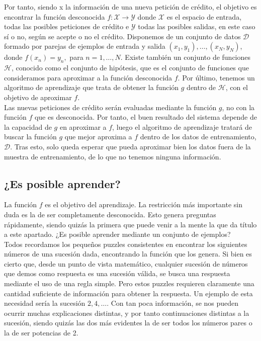 Por tanto, siendo x la información de una nueva petición de crédito, el objetivo es encontrar la función desconocida $f: \mathcal{X} \rightarrow \mathcal{Y}$ donde $\mathcal{X}$ es el espacio de entrada, todas las posibles peticiones de crédito e $\mathcal{Y}$ todas las posibles salidas, en este caso sí o no, según se acepte o no el crédito. Disponemos de un conjunto de datos $\mathcal{D}$ formado por parejas de ejemplos de entrada y salida $(x_1,y_1),\ldots,(x_N,y_N)$, donde $f(x_n)=y_n, $ para $ n = 1,\ldots,N$. Existe también un conjunto de funciones $\mathcal{H}$, conocido como el conjunto de hipótesis, que es el conjunto de funciones que consideramos para aproximar a la función desconocida $f$. Por último, tenemos un algoritmo de aprendizaje que trata de obtener la función $g$ dentro de $\mathcal{H}$, con el objetivo de aproximar $f$.\\

Las nuevas peticiones de crédito serán evaluadas mediante la función $g$, no con la función $f$ que es desconocida. Por tanto, el buen resultado del sistema depende de la capacidad de $g$ en aproximar a $f$, luego el algoritmo de aprendizaje tratará de buscar la función $g$ que mejor aproxima a $f$ dentro de los datos de entrenamiento, $\mathcal{D}$. Tras esto, solo queda esperar que pueda aproximar bien los datos fuera de la muestra de entrenamiento, de lo que no tenemos ninguna información.\\

\subsection{¿Es posible aprender?}

La función $f$ es el objetivo del aprendizaje. La restricción más importante sin duda es la de ser completamente desconocida. Esto genera preguntas rápidamente, siendo quizás la primera que puede venir a la mente la que da título a este apartado. ¿Es posible aprender mediante un conjunto de ejemplos?\\

Todos recordamos los pequeños puzzles consistentes en encontrar los siguientes números de una sucesión dada, encontrando la función que los genera. Si bien es cierto que, desde un punto de vista matemático, cualquier sucesión de números que demos como respuesta es una sucesión válida, se busca una respuesta mediante el uso de una regla simple. Pero estos puzzles requieren claramente una cantidad suficiente de información para obtener la respuesta. Un ejemplo de esta necesidad sería la sucesión ${2,4,\ldots}$. Con tan poca información, se nos pueden ocurrir muchas explicaciones distintas, y por tanto continuaciones distintas a la sucesión, siendo quizás las dos más evidentes la de ser todos los números pares o la de ser potencias de 2.\\

